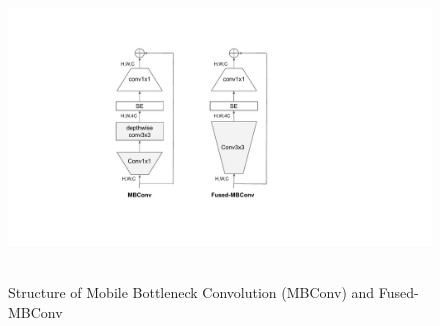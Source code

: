 \begin{figure}[h!]
    \centering
        \includegraphics[clip, height=8cm]{images/fusedmbconv.pdf}
    \caption{Structure of Mobile Bottleneck Convolution (MBConv) and Fused-MBConv}
    \label{fig:fusedmbconv}
    \end{figure}






 
